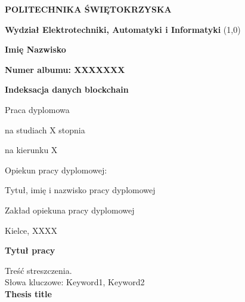 \documentclass[a4paper,12pt]{report}
\newcommand\blankpage{%
    \null
    \thispagestyle{empty}%
    \addtocounter{page}{-1}%
    \newpage}
\begin{document}
\onehalfspacing

\begin{center}

\thispagestyle{empty}
\large 
\textbf{POLITECHNIKA ŚWIĘTOKRZYSKA}

\textbf{Wydział Elektrotechniki, Automatyki i Informatyki}
\line(1,0){\linewidth}

\vskip 1.2in

\textbf{Imię Nazwisko}

\textbf{Numer albumu: XXXXXXX}

\vskip 1.2in

\textbf{Indeksacja danych blockchain}

Praca dyplomowa

na studiach X stopnia

na kierunku X

\end{center}

\vskip 1.2in

\begin{flushright}
Opiekun pracy dyplomowej:

Tytuł, imię i nazwisko pracy dyplomowej

Zakład opiekuna pracy dyplomowej
\end{flushright}

\vskip 1in

\begin{center}
Kielce, XXXX
\end{center}

\afterpage{\blankpage}

\newpage
\thispagestyle{empty}

\afterpage{\blankpage}

\newpage
\thispagestyle{empty}

\afterpage{\blankpage}

\newpage
\thispagestyle{empty}

\noindent \textbf{Tytuł pracy}

\noindent Treść streszczenia. \\

\noindent Słowa kluczowe: Keyword1, Keyword2 \\

\noindent \textbf{Thesis title}
\end{document}
